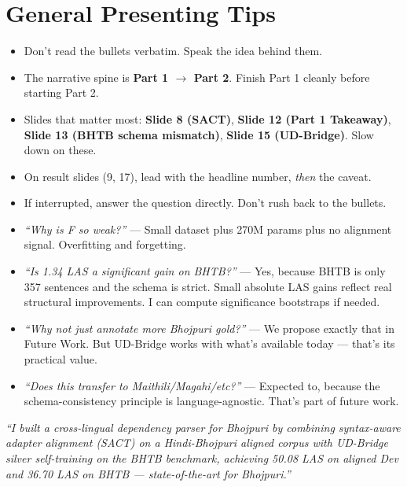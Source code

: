 \documentclass[11pt]{article}
\begin{document}
\clearpage

\section*{General Presenting Tips}

\begin{tcolorbox}[colback=softbg,colframe=accent,boxrule=0.3pt,title=\textbf{While speaking},coltitle=white,colbacktitle=accent]
\begin{itemize}[leftmargin=*,itemsep=3pt]
  \item Don't read the bullets verbatim. Speak the idea behind them.
  \item The narrative spine is \textbf{Part 1 $\to$ Part 2}. Finish Part 1 cleanly before starting Part 2.
  \item Slides that matter most: \textbf{Slide 8 (SACT)}, \textbf{Slide 12 (Part 1 Takeaway)}, \textbf{Slide 13 (BHTB schema mismatch)}, \textbf{Slide 15 (UD-Bridge)}. Slow down on these.
  \item On result slides (9, 17), lead with the headline number, \textit{then} the caveat.
  \item If interrupted, answer the question directly. Don't rush back to the bullets.
\end{itemize}
\end{tcolorbox}

\begin{tcolorbox}[colback=yellow!10,colframe=orange!70,boxrule=0.3pt,title=\textbf{Handling tough questions},coltitle=white,colbacktitle=orange!80!black]
\begin{itemize}[leftmargin=*,itemsep=3pt]
  \item \textit{``Why is F so weak?''} --- Small dataset plus 270M params plus no alignment signal. Overfitting and forgetting.
  \item \textit{``Is 1.34 LAS a significant gain on BHTB?''} --- Yes, because BHTB is only 357 sentences and the schema is strict. Small absolute LAS gains reflect real structural improvements. I can compute significance bootstraps if needed.
  \item \textit{``Why not just annotate more Bhojpuri gold?''} --- We propose exactly that in Future Work. But UD-Bridge works with what's available today --- that's its practical value.
  \item \textit{``Does this transfer to Maithili/Magahi/etc?''} --- Expected to, because the schema-consistency principle is language-agnostic. That's part of future work.
\end{itemize}
\end{tcolorbox}

\begin{tcolorbox}[colback=part1color!5,colframe=part1color,boxrule=0.3pt,title=\textbf{One-sentence elevator pitch (if asked to compress)},coltitle=white,colbacktitle=part1color]
\textit{``I built a cross-lingual dependency parser for Bhojpuri by combining syntax-aware adapter alignment (SACT) on a Hindi-Bhojpuri aligned corpus with UD-Bridge silver self-training on the BHTB benchmark, achieving 50.08 LAS on aligned Dev and 36.70 LAS on BHTB --- state-of-the-art for Bhojpuri.''}
\end{tcolorbox}
\end{document}

